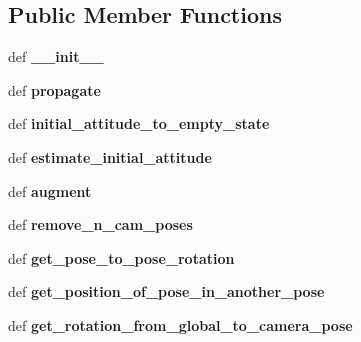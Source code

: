 \subsection*{Public Member Functions}
\begin{DoxyCompactItemize}
\item 
\hypertarget{classmsckf_1_1_state_a9eb4d9b6a0b22caf27964aae8321a8e4}{def {\bfseries \-\_\-\-\_\-init\-\_\-\-\_\-}}\label{classmsckf_1_1_state_a9eb4d9b6a0b22caf27964aae8321a8e4}

\item 
\hypertarget{classmsckf_1_1_state_ac6068aa29aaf8c12303feec1b194cee4}{def {\bfseries propagate}}\label{classmsckf_1_1_state_ac6068aa29aaf8c12303feec1b194cee4}

\item 
\hypertarget{classmsckf_1_1_state_acdb6b5075cf233ff40c38808a4e9b76f}{def {\bfseries initial\-\_\-attitude\-\_\-to\-\_\-empty\-\_\-state}}\label{classmsckf_1_1_state_acdb6b5075cf233ff40c38808a4e9b76f}

\item 
\hypertarget{classmsckf_1_1_state_a835e12a679c2dc50248383778bbb3d3b}{def {\bfseries estimate\-\_\-initial\-\_\-attitude}}\label{classmsckf_1_1_state_a835e12a679c2dc50248383778bbb3d3b}

\item 
\hypertarget{classmsckf_1_1_state_ae7c94f98c60ea6ed26d2fcf6e40d4d64}{def {\bfseries augment}}\label{classmsckf_1_1_state_ae7c94f98c60ea6ed26d2fcf6e40d4d64}

\item 
\hypertarget{classmsckf_1_1_state_a12ce863f430cec8c26e780341beffa81}{def {\bfseries remove\-\_\-n\-\_\-cam\-\_\-poses}}\label{classmsckf_1_1_state_a12ce863f430cec8c26e780341beffa81}

\item 
\hypertarget{classmsckf_1_1_state_a4e782e52dd630137558f15c5c3ef0a93}{def {\bfseries get\-\_\-pose\-\_\-to\-\_\-pose\-\_\-rotation}}\label{classmsckf_1_1_state_a4e782e52dd630137558f15c5c3ef0a93}

\item 
\hypertarget{classmsckf_1_1_state_a8aa0ea4bfcb8f10a26210779211bc72c}{def {\bfseries get\-\_\-position\-\_\-of\-\_\-pose\-\_\-in\-\_\-another\-\_\-pose}}\label{classmsckf_1_1_state_a8aa0ea4bfcb8f10a26210779211bc72c}

\item 
\hypertarget{classmsckf_1_1_state_a675ba96049a53a5b524ec12d6b1db492}{def {\bfseries get\-\_\-rotation\-\_\-from\-\_\-global\-\_\-to\-\_\-camera\-\_\-pose}}\label{classmsckf_1_1_state_a675ba96049a53a5b524ec12d6b1db492}


\end{DoxyCompactItemize}
